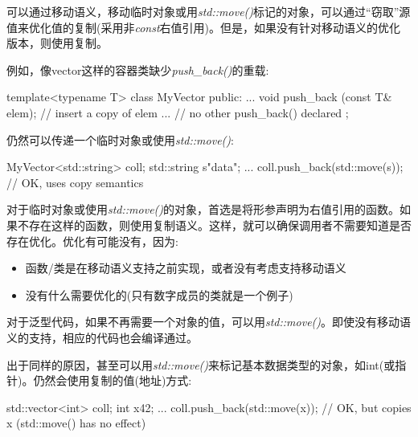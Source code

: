 可以通过移动语义，移动临时对象或用\textit{std::move()}标记的对象，可以通过“窃取”源值来优化值的复制(采用非\textit{const}右值引用)。但是，如果没有针对移动语义的优化版本，则使用复制。

例如，像vector这样的容器类缺少\textit{push_back()}的重载:

\begin{cppcode}
template<typename T>
class MyVector {
	public:
	...
	void push_back (const T& elem); // insert a copy of elem
	... // no other push_back() declared
};
\end{cppcode}
	
仍然可以传递一个临时对象或使用\textit{std::move()}:

\begin{cppcode}
MyVector<std::string> coll;
std::string s{"data"};
...
coll.push_back(std::move(s)); // OK, uses copy semantics
\end{cppcode}	
	
对于临时对象或使用\textit{std::move()}的对象，首选是将形参声明为右值引用的函数。如果不存在这样的函数，则使用复制语义。这样，就可以确保调用者不需要知道是否存在优化。优化有可能没有，因为:

	
\begin{itemize}
	\item 函数/类是在移动语义支持之前实现，或者没有考虑支持移动语义
	\item 没有什么需要优化的(只有数字成员的类就是一个例子)
\end{itemize}
	
对于泛型代码，如果不再需要一个对象的值，可以用\textit{std::move()}。即使没有移动语义的支持，相应的代码也会编译通过。

	
出于同样的原因，甚至可以用\textit{std::move()}来标记基本数据类型的对象，如int(或指针)。仍然会使用复制的值(地址)方式:

	
\begin{cppcode}
std::vector<int> coll;
int x{42};
...
coll.push_back(std::move(x)); // OK, but copies x (std::move() has no effect)
\end{cppcode}
	
	
	